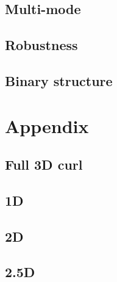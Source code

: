 \subsection{Multi-mode}
\subsection{Robustness}
\subsection{Binary structure}


\section{Appendix}
\subsection{Full 3D curl}
\subsection{1D}
\subsection{2D}
\subsection{2.5D}

